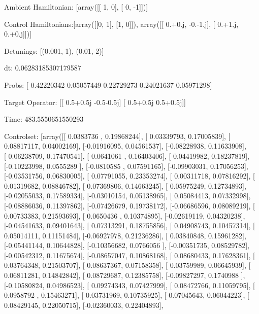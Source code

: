 \documentclass{article}
\begin{document}
    

\newpage

Ambient Hamiltonian: [array([[ 1,  0],
       [ 0, -1]])]

Control Hamiltonians:[array([[0, 1],
       [1, 0]]), array([[ 0.+0.j, -0.-1.j],
       [ 0.+1.j,  0.+0.j]])]

Detunings: [(0.001, 1), (0.01, 2)]

 dt: 0.06283185307179587

Probs: [ 0.42220342  0.05057449  0.22729273  0.24021637  0.05971298]

Target Operator: [[ 0.5+0.5j -0.5-0.5j]
 [ 0.5+0.5j  0.5+0.5j]]

Time: 483.5550651550293

Controlset: [array([[ 0.0383736 ,  0.19868244],
       [ 0.03339793,  0.17005839],
       [ 0.08817117,  0.04002169],
       [-0.01916095,  0.04561537],
       [-0.08228938,  0.11633908],
       [-0.06238709,  0.17470541],
       [-0.0641061 ,  0.16403406],
       [-0.04419982,  0.18237819],
       [-0.10223998,  0.0555289 ],
       [-0.0810585 ,  0.07591165],
       [-0.09903031,  0.17056253],
       [-0.03531756,  0.06830005],
       [ 0.07791055,  0.23353274],
       [ 0.00311718,  0.07816292],
       [ 0.01319682,  0.08846782],
       [ 0.07369806,  0.14663245],
       [ 0.05975249,  0.12734893],
       [-0.02055033,  0.17589334],
       [-0.03010154,  0.05138965],
       [ 0.05084413,  0.07332998],
       [-0.08886036,  0.11397862],
       [-0.07426679,  0.19738172],
       [-0.06686596,  0.08089219],
       [ 0.00733383,  0.21593693],
       [ 0.0650436 ,  0.10374895],
       [-0.02619119,  0.04320238],
       [-0.04541633,  0.09401643],
       [ 0.07313291,  0.18755856],
       [ 0.04908743,  0.10457314],
       [ 0.05014111,  0.11151484],
       [-0.06927978,  0.21236286],
       [ 0.03840848,  0.15961282],
       [-0.05441144,  0.10644828],
       [-0.10356682,  0.0766056 ],
       [-0.00351735,  0.08529782],
       [-0.00542312,  0.11675674],
       [-0.08657047,  0.10868168],
       [ 0.08680433,  0.17628361],
       [ 0.03764348,  0.21503707],
       [ 0.08637367,  0.07158358],
       [ 0.03759989,  0.06645939],
       [ 0.06811281,  0.14842842],
       [ 0.08729687,  0.12385758],
       [-0.09827297,  0.1740988 ],
       [-0.10580824,  0.04986523],
       [ 0.09274343,  0.07427999],
       [ 0.08472766,  0.11059795],
       [ 0.0958792 ,  0.15463271],
       [ 0.03731969,  0.10735925],
       [-0.07045643,  0.06044223],
       [ 0.08429145,  0.22050715],
       [-0.02360033,  0.22404893],
\end{document}
